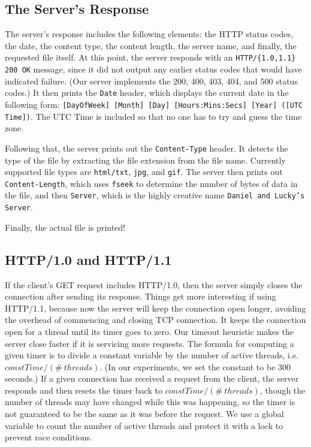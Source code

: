 \documentclass[letterpaper,11pt,twocolumn]{article}
\begin{document}
\subsection{The Server's Response}

The server's response includes the following elements: the HTTP status codes, the date, the content type, the content length, the server name, and
finally, the requested file itself. At this point, the server responds with an \texttt{HTTP/\{1.0,1.1\} 200 OK} message, since it did not output any
earlier status codes that would have indicated failure. (Our server implements the 200, 400, 403, 404, and 500 status codes.) It then prints the
\texttt{Date} header, which displays the current date in the following form: \texttt{[DayOfWeek] [Month] [Day] [Hours:Mins:Secs] [Year] ([UTC Time])}.
The UTC Time is included so that no one has to try and guess the time zone.

Following that, the server prints out the \texttt{Content-Type} header. It detects the type of the file by extracting the file extension from the file
name. Currently supported file types are \texttt{html/txt}, \texttt{jpg}, and \texttt{gif}. The server then prints out \texttt{Content-Length}, which
uses \texttt{fseek} to determine the number of bytes of data in the file, and then \texttt{Server}, which is the highly creative name \texttt{Daniel
and Lucky's Server}.

Finally, the actual file is printed!

\subsection{HTTP/1.0 and HTTP/1.1}

If the client's GET request includes HTTP/1.0, then the server simply closes the connection after sending its response. Things get more interesting if
using HTTP/1.1, because now the server will keep the connection open longer, avoiding the overhead of commencing and closing TCP connection. It keeps
the connection open for a thread until its timer goes to zero. Our timeout heuristic makes the server close faster if it is servicing more requests.
The formula for computing a given timer is to divide a constant variable by the number of active threads, i.e. $constTime /(\#\:threads)$. (In our
experiments, we set the constant to be 300 seconds.) If a given connection has received a request from the client, the server responds and then resets
the timer back to $constTime /(\#\:threads)$, though the number of threads may have changed while this was happening, so the timer is not guaranteed to
be the same as it was before the request. We use a global variable to count the number of active threads and protect it with a lock to prevent race
conditions.
\end{document}
